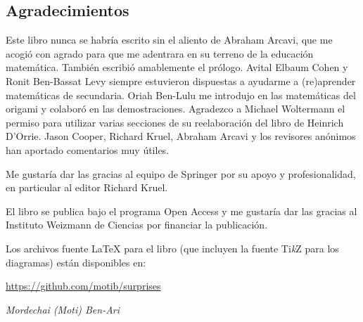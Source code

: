 \subsection*{Agradecimientos}

Este libro nunca se habría escrito sin el aliento de Abraham Arcavi, que me acogió con agrado para que me adentrara en su terreno de la educación matemática. También escribió amablemente el prólogo. Avital Elbaum Cohen y Ronit Ben-Bassat Levy siempre estuvieron dispuestas a ayudarme a (re)aprender matemáticas de secundaria. Oriah Ben-Lulu me introdujo en las matemáticas del origami y colaboró en las demostraciones. Agradezco a Michael Woltermann el permiso para utilizar varias secciones de su reelaboración del libro de Heinrich D'Orrie. Jason Cooper, Richard Kruel, Abraham Arcavi y los revisores anónimos han aportado comentarios muy útiles.

Me gustaría dar las gracias al equipo de Springer por su apoyo y profesionalidad, en particular al editor Richard Kruel.

El libro se publica bajo el programa Open Access y me gustaría dar las gracias al Instituto Weizmann de Ciencias por financiar la publicación.

Los archivos fuente \LaTeX{} para el libro (que incluyen la fuente Ti\textit{k}Z para los diagramas) están disponibles en:
\begin{center}
\url{https://github.com/motib/surprises}
\end{center}

\medskip

\begin{flushright}
\textit{Mordechai (Moti) Ben-Ari}
\end{flushright}

\tableofcontents
